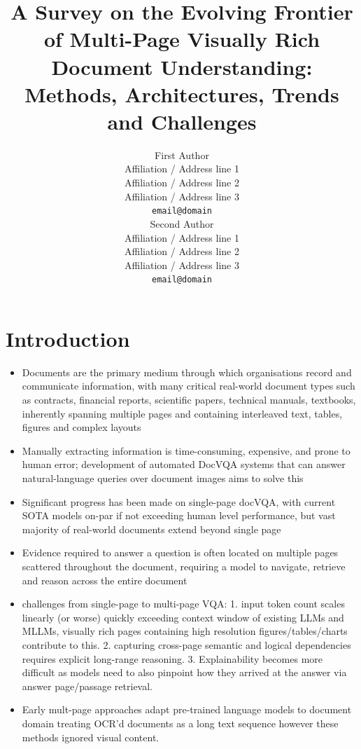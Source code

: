 \documentclass[11pt]{article}
\title{A Survey on the Evolving Frontier of Multi-Page Visually Rich Document Understanding: Methods, Architectures, Trends and Challenges}
\author{First Author \\
  Affiliation / Address line 1 \\
  Affiliation / Address line 2 \\
  Affiliation / Address line 3 \\
  \texttt{email@domain} \\\And
  Second Author \\
  Affiliation / Address line 1 \\
  Affiliation / Address line 2 \\
  Affiliation / Address line 3 \\
  \texttt{email@domain} \\}
\begin{document}
\maketitle
\begin{abstract}
\end{abstract}

\section{Introduction}

\begin{itemize}
    \item Documents are the primary medium through which organisations record and communicate information, with many critical real-world document types such as contracts, financial reports, scientific papers, technical manuals, textbooks, inherently spanning multiple pages and containing interleaved text, tables, figures and complex layouts \cite{tito2023hierarchical, borchmann2025arctic}
    \item Manually extracting information is time-consuming, expensive, and prone to human error; development of automated DocVQA systems that can answer natural-language queries over document images aims to solve this
    \item Significant progress has been made on single-page docVQA, with current SOTA models on-par if not exceeding human level performance, but vast majority of real-world documents extend beyond single page \cite{tito2023hierarchical}
    \item Evidence required to answer a question is often located on multiple pages scattered throughout the document, requiring a model to navigate, retrieve and reason across the entire document \cite{blau2024gram, borchmann2025arctic}
    \item challenges from single-page to multi-page VQA: 1. input token count scales linearly (or worse) quickly exceeding context window of existing LLMs and MLLMs, visually rich pages containing high resolution figures/tables/charts contribute to this. 2. capturing cross-page semantic and logical dependencies requires explicit long-range reasoning. 3. Explainability becomes more difficult as models need to also pinpoint how they arrived at the answer via answer page/passage retrieval.
    \item Early mult-page approaches adapt pre-trained language models to document domain treating OCR'd documents as a long text sequence however these methods ignored visual content.

\end{itemize}
\end{document}
